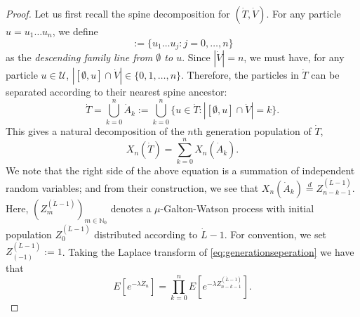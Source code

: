 \documentclass[12pt,a4paper]{amsart}
\numberwithin{equation}{section}
\begin{document}
\begin{proof}
	
	Let us first recall the spine decomposition for $(\dot T,\dot V)$.
	For any particle $u=u_1\dots u_n$, we define
\begin{equation*}
	[\emptyset, u]
	:= \{u_1\dots u_j:j=0,\dots, n \}
\end{equation*}
	as the \emph{descending family line from $\emptyset$ to $u$}.
	Since $|\dot V|=n$, we must have, for any particle $u\in\mathcal U$, $|[\emptyset, u]\cap\dot V|\in \{0,1,\dots,n\}$.
	Therefore, the particles in $\dot T$ can be separated according to their nearest spine ancestor:
\[
		\dot T
	=
		\bigcup_{k=0}^n\dot A_k
	:=
		\bigcup_{k=0}^n\{u\in\dot T:| [\emptyset, u] \cap \dot V |=k\}.
\]
	This gives a natural decomposition of the $n$th generation population of $\dot T$,
\begin{equation}
\label{eq:generationseperation}
		X_n(\dot T)
	=
		\sum_{k=0}^nX_n(\dot A_k).
\end{equation}
	We note that the right side of the above equation is a summation of independent random variables; 
	and from their construction, we see that $X_n(\dot A_k) \overset{d}= Z_{n-k-1}^{(\dot L - 1)}$.
	Here,  $(Z^{(\dot L - 1)}_m)_{m\in \mathbb N_0}$ denotes a $\mu$-Galton-Watson process with initial population $Z^{(\dot L - 1)}_0$ distributed according to $\dot L - 1$. 
	For convention, we set $Z^{(\dot L - 1)}_{(-1)}:= 1$.
	Taking the Laplace transform of \eqref{eq:generationseperation} we have that
\begin{equation} \label{eq: laplace transform of one-spine decomposition}
	E [e^{-\lambda \dot Z_n}] 
	= \prod_{k = 0}^n E[ e^{-\lambda Z^{(\dot L - 1)}_{n-k-1}} ].
\end{equation}
	

\end{proof}
\end{document}
